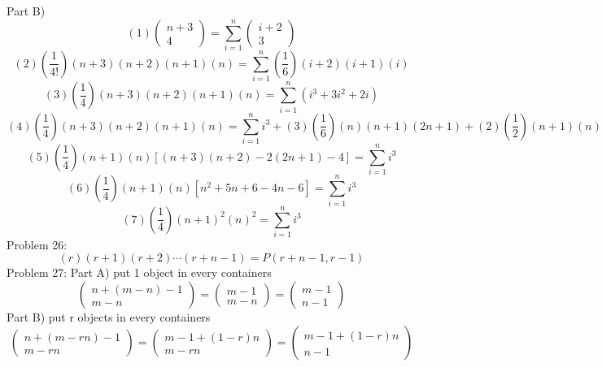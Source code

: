 \documentclass{article}
\begin{document}
	Part B)
	$$
	(1)
	\left(\begin{array}{c}
	n+3\\
	4
	\end{array}\right)
	=
	\sum_{i=1}^{n}
	\left(\begin{array}{c}
	i+2\\
	3
	\end{array}\right)
	$$
	$$
	(2)
	\left(
	\frac{1}{4!}
	\right)
	(n+3)(n+2)(n+1)(n)
	=
	\sum_{i=1}^{n}
	\left(
	\frac{1}{6}
	\right)
	(i+2)(i+1)(i)
	$$
	$$
	(3)
	\left(
	\frac{1}{4}
	\right)
	(n+3)(n+2)(n+1)(n)
	=
	\sum_{i=1}^{n}
	(i^3+3i^2+2i)
	$$
	$$
	(4)
	\left(
	\frac{1}{4}
	\right)
	(n+3)(n+2)(n+1)(n)
	=
	\sum_{i=1}^{n}
	i^3
	+
	(3)
	\left(
	\frac{1}{6}
	\right)
	(n)(n+1)(2n+1)
	+
	(2)
	\left(
	\frac{1}{2}
	\right)
	(n+1)(n)
	$$
	$$
	(5)
	\left(
	\frac{1}{4}
	\right)
	(n+1)(n)[(n+3)(n+2)-2(2n+1)-4]
	=
	\sum_{i=1}^{n} i^3
	$$
	$$
	(6)
	\left(
	\frac{1}{4}
	\right)
	(n+1)(n)[n^2+5n+6-4n-6]
	=
	\sum_{i=1}^{n} i^3
	$$
	$$
	(7)
	\left(
	\frac{1}{4}
	\right)
	(n+1)^2(n)^2
	=
	\sum_{i=1}^{n} i^3
	$$
	Problem 26:
	$$
	(r)(r+1)(r+2)\cdots(r+n-1)
	=
	P(r+n-1,r-1)
	$$
	Problem 27: Part A)
	put 1 object in every containers
	$$
	\left(\begin{array}{c}
	n+(m-n)-1\\
	m-n
	\end{array}\right)
	=
	\left(\begin{array}{c}
	m-1\\
	m-n
	\end{array}\right)
	=
	\left(\begin{array}{c}
	m-1\\
	n-1
	\end{array}\right)
	$$
	Part B)
	put r objects in every containers
	$$
	\left(\begin{array}{c}
	n+(m-rn)-1\\
	m-rn
	\end{array}\right)
	=
	\left(\begin{array}{c}
	m-1+(1-r)n\\
	m-rn
	\end{array}\right)
	=
	\left(\begin{array}{c}
	m-1+(1-r)n\\
	n-1
	\end{array}\right)
	$$
\end{document}
